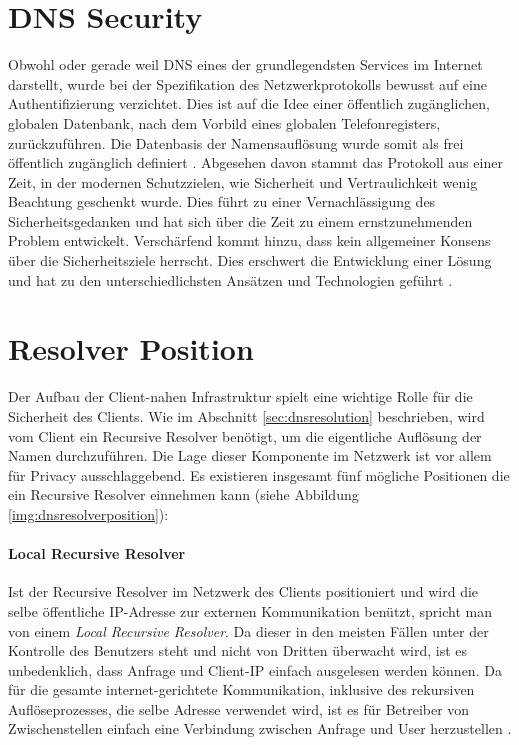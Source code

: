\section{DNS Security}
\label{sec:dnssecurity}
Obwohl oder gerade weil DNS eines der grundlegendsten Services im Internet darstellt, wurde bei der Spezifikation des Netzwerkprotokolls bewusst auf eine Authentifizierung verzichtet. Dies ist auf die Idee einer öffentlich zugänglichen, globalen Datenbank, nach dem Vorbild eines globalen Telefonregisters, zurückzuführen. Die Datenbasis der Namensauflösung wurde somit als frei öffentlich zugänglich definiert \cite{rfc1035}. Abgesehen davon stammt das Protokoll aus einer Zeit, in der modernen Schutzzielen, wie Sicherheit und Vertraulichkeit wenig Beachtung geschenkt wurde. Dies führt zu einer Vernachlässigung des Sicherheitsgedanken und hat sich über die Zeit zu einem ernstzunehmenden Problem entwickelt. Verschärfend kommt hinzu, dass kein allgemeiner Konsens über die Sicherheitsziele herrscht. Dies erschwert die Entwicklung einer Lösung und hat zu den unterschiedlichsten Ansätzen und Technologien geführt \cite{Grothoff2018}.

\section{Resolver Position}
\label{sec:dnsresolverposition}
Der Aufbau der Client-nahen Infrastruktur spielt eine wichtige Rolle für die Sicherheit des Clients. Wie im Abschnitt \ref{sec:dnsresolution} beschrieben, wird vom Client ein Recursive Resolver benötigt, um die eigentliche Auflösung der Namen durchzuführen. Die Lage dieser Komponente im Netzwerk ist vor allem für Privacy ausschlaggebend. Es existieren insgesamt fünf mögliche Positionen die ein Recursive Resolver einnehmen kann \cite{VanHeugten2018} (siehe Abbildung \ref{img:dnsresolverposition}):

\paragraph{Local Recursive Resolver}
Ist der Recursive Resolver im Netzwerk des Clients positioniert und wird die selbe öffentliche IP-Adresse zur externen Kommunikation benützt, spricht man von einem \textit{Local Recursive Resolver}. Da dieser in den meisten Fällen unter der Kontrolle des Benutzers steht und nicht von Dritten überwacht wird, ist es unbedenklich, dass Anfrage und Client-IP einfach ausgelesen werden können. Da für die gesamte internet-gerichtete Kommunikation, inklusive des rekursiven Auflöseprozesses, die selbe Adresse verwendet wird, ist es für Betreiber von Zwischenstellen einfach eine Verbindung zwischen Anfrage und User herzustellen \cite{Shulman2014}.

